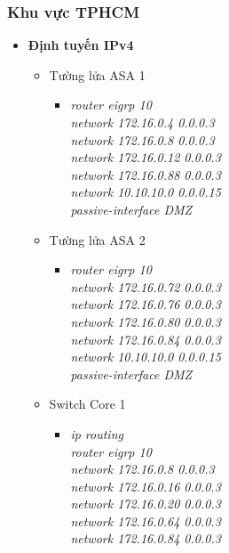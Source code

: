\documentclass[12pt,a4paper]{report}
\begin{document}
\subsubsection{Khu vực TPHCM}
\begin{itemize}
      \item \textbf{Định tuyến IPv4}
      
      \begin{itemize}
        \item Tường lửa ASA 1
        \begin{itemize}
          \item \textit{router eigrp 10\\
network 172.16.0.4 0.0.0.3 \\
network 172.16.0.8 0.0.0.3 \\
network 172.16.0.12 0.0.0.3 \\
network 172.16.0.88 0.0.0.3\\
network 10.10.10.0 0.0.0.15\\
passive-interface DMZ\\}
        
        \end{itemize}
        \item Tường lửa ASA 2
        \begin{itemize}
         \item \textit{router eigrp 10\\
network 172.16.0.72 0.0.0.3 \\
network 172.16.0.76 0.0.0.3 \\
network 172.16.0.80 0.0.0.3 \\
network 172.16.0.84 0.0.0.3\\
network 10.10.10.0 0.0.0.15\\
passive-interface DMZ\\}
         
          \end{itemize}
           \item Switch Core 1
        \begin{itemize}
         \item \textit{ip routing\\
router eigrp 10\\
network 172.16.0.8 0.0.0.3 \\
network 172.16.0.16 0.0.0.3 \\
network 172.16.0.20 0.0.0.3 \\
network 172.16.0.64 0.0.0.3 \\
network 172.16.0.84 0.0.0.3\\}
         

\end{itemize}
\end{itemize}
\end{itemize}
\end{document}
